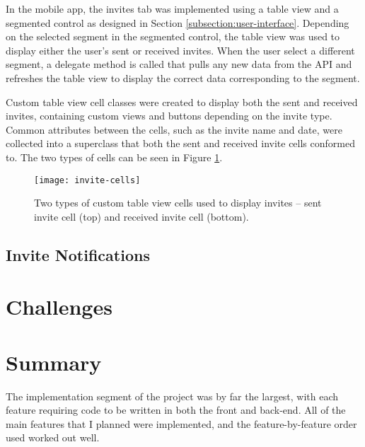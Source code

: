 In the mobile app, the invites tab was implemented using a table view and a segmented control as designed in Section \ref{subsection:user-interface}. Depending on the selected segment in the segmented control, the table view was used to display either the user's sent or received invites. When the user select a different segment, a delegate method is called that pulls any new data from the API and refreshes the table view to display the correct data corresponding to the segment.

Custom table view cell classes were created to display both the sent and received invites, containing custom views and buttons depending on the invite type. Common attributes between the cells, such as the invite name and date, were collected into a superclass that both the sent and received invite cells conformed to. The two types of cells can be seen in Figure \ref{fig:invite-cells}.

\begin{figure}[hbt]
  \centering
  \texttt{[image: invite-cells]}
  \caption{Two types of custom table view cells used to display invites -- sent invite cell (top) and received invite cell (bottom).}
  \label{fig:invite-cells}
\end{figure}

\subsection{Invite Notifications}


\section{Challenges}


\section{Summary}

The implementation segment of the project was by far the largest, with each feature requiring code to be written in both the front and back-end. All of the main features that I planned were implemented, and the feature-by-feature order used worked out well.





